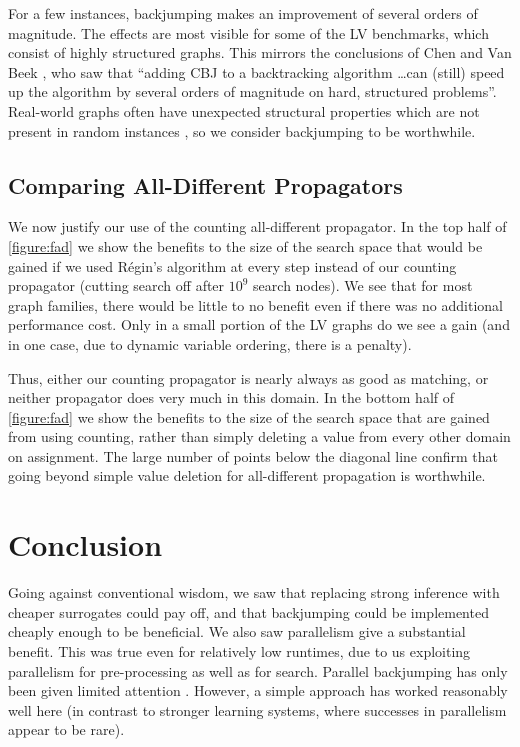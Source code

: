 \documentclass{llncs}
\begin{document}
For a few instances, backjumping makes an improvement of several orders of magnitude. The effects
are most visible for some of the LV benchmarks, which consist of highly structured graphs. This
mirrors the conclusions of Chen and Van Beek \cite{Chen:2001}, who saw that ``adding CBJ to a
backtracking algorithm \ldots can (still) speed up the algorithm by several orders of magnitude on
hard, structured problems''.  Real-world graphs often have unexpected structural properties which
are not present in random instances \cite{MacIntyre:1998,Slater:2014}, so we consider backjumping to
be worthwhile.

\subsection{Comparing All-Different Propagators}

We now justify our use of the counting all-different propagator. In the top half of
\cref{figure:fad} we show the benefits to the size of the search space that would be gained if we
used R\'egin's algorithm at every step instead of our counting propagator (cutting search off after
$10^9$ search nodes). We see that for most graph families, there would be little to no benefit even
if there was no additional performance cost. Only in a small portion of the LV graphs do we see a
gain (and in one case, due to dynamic variable ordering, there is a penalty).

Thus, either our counting propagator is nearly always as good as matching, or neither propagator
does very much in this domain. In the bottom half of \cref{figure:fad} we show the benefits to the
size of the search space that are gained from using counting, rather than simply deleting a value
from every other domain on assignment. The large number of points below the diagonal line confirm
that going beyond simple value deletion for all-different propagation is worthwhile.

\section{Conclusion}

Going against conventional wisdom, we saw that replacing strong inference with cheaper surrogates
could pay off, and that backjumping could be implemented cheaply enough to be beneficial. We also
saw parallelism give a substantial benefit. This was true even for relatively low runtimes, due to
us exploiting parallelism for pre-processing as well as for search.  Parallel backjumping has only
been given limited attention \cite{Conrad:1994,Habbas:1997,Cope:2000}.  However, a simple approach
has worked reasonably well here (in contrast to stronger learning systems, where successes in
parallelism appear to be rare).
\end{document}
